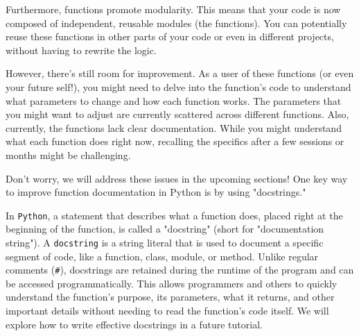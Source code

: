 Furthermore, functions promote modularity. This means that your code is now composed of independent, reusable modules (the functions). You can potentially reuse these functions in other parts of your code or even in different projects, without having to rewrite the logic.

However, there's still room for improvement. As a user of these functions (or even your future self!), you might need to delve into the function's code to understand what parameters to change and how each function works. The parameters that you might want to adjust are currently scattered across different functions. Also, currently, the functions lack clear documentation. While you might understand what each function does right now, recalling the specifics after a few sessions or months might be challenging.

Don't worry, we will address these issues in the upcoming sections! One key way to improve function documentation in Python is by using "docstrings."

In \texttt{Python}, a statement that describes what a function does, placed right at the beginning of the function, is called a "docstring" (short for "documentation string"). A \texttt{docstring} is a string literal that is used to document a specific segment of code, like a function, class, module, or method. Unlike regular comments (\texttt{\#}), docstrings are retained during the runtime of the program and can be accessed programmatically. This allows programmers and others to quickly understand the function's purpose, its parameters, what it returns, and other important details without needing to read the function's code itself. We will explore how to write effective docstrings in a future tutorial.
